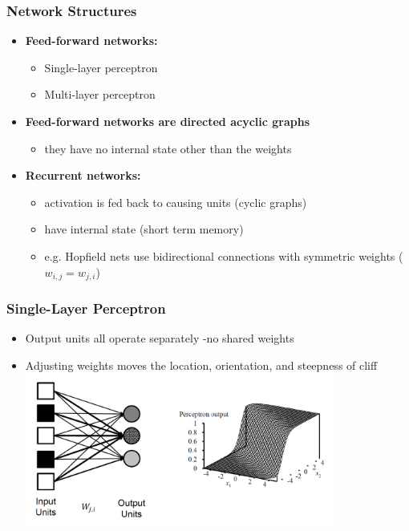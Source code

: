 \documentclass[conference, a4paper]{styles/acmsiggraph}
\begin{document}
        \subsubsection{Network Structures}
            \begin{itemize}
                \item \textbf{Feed-forward networks:}
                \begin{itemize}
                    \item Single-layer perceptron
                    \item Multi-layer perceptron
                \end{itemize}
                \item \textbf{Feed-forward networks are directed acyclic graphs}
                \begin{itemize}
                    \item they have no internal state other than the weights
                \end{itemize}
                \item \textbf{Recurrent networks:}
                \begin{itemize}
                    \item activation is fed back to causing units (cyclic graphs)
                    \item have internal state (short term memory)
                    \item e.g. Hopfield nets use bidirectional connections with symmetric weights ($w_{i,j} = w_{j,i}$)
                \end{itemize}
            \end{itemize}
        
        \subsubsection{Single-Layer Perceptron}
            \begin{itemize}
                \item Output units all operate separately -no shared weights
                \item Adjusting weights moves the location, orientation, and steepness of cliff\newline
                \includegraphics[width=0.8\textwidth]{imgs/SingleLayerPerceptron.png}
            \end{itemize}
        
\end{document}
